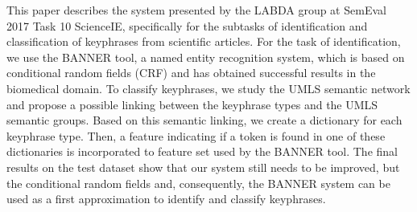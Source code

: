 This paper describes the system presented by the LABDA group at SemEval 2017 Task 10 ScienceIE, specifically for the subtasks of identification and classification of keyphrases from scientific articles. For the task of identification, we use the BANNER tool, a named entity recognition system, which is based on conditional random fields (CRF) and has obtained successful results in the biomedical domain. To classify keyphrases, we study the UMLS semantic network and propose a possible linking between the keyphrase types and the UMLS semantic groups. Based on this semantic linking, we create a dictionary for each keyphrase type. Then, a feature indicating if a token is found in one of these dictionaries is incorporated to feature set used by the BANNER tool. The final results on the test dataset show that our system still needs to be improved, but the conditional random fields and, consequently, the BANNER system can be used as a first approximation to identify and classify keyphrases.
